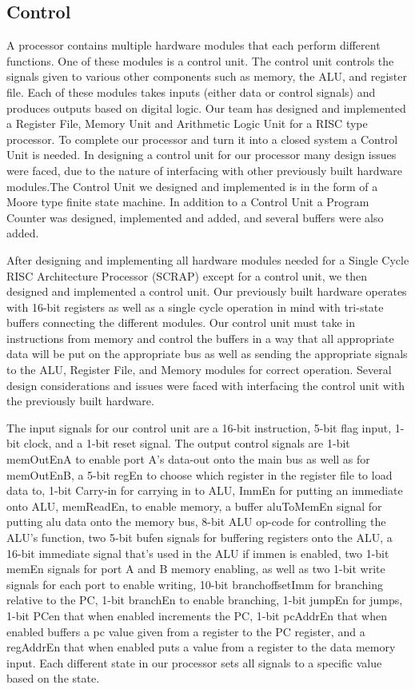 \documentclass[onecolumn, 12pt]{IEEEtran}
\begin{document}
\subsection{Control}
A processor contains multiple hardware modules that each perform different functions. One of these modules is a control unit. The control unit controls the signals given to various other components such as memory, the ALU, and register file. Each of these modules takes inputs (either data or control signals) and produces outputs based on digital logic. Our team has designed and implemented a Register File, Memory Unit and Arithmetic Logic Unit for a RISC type processor. To complete our processor and turn it into a closed system a Control Unit is needed. In designing a control unit for our processor many design issues were faced, due to the nature of interfacing with other previously built hardware modules.The Control Unit we designed and implemented is in the form of a Moore type finite state machine. In addition to a Control Unit a Program Counter was designed, implemented and added, and several buffers were also added.
\par
	After designing and implementing all hardware modules needed for a Single Cycle RISC Architecture Processor (SCRAP) except for a control unit, we then designed and implemented a control unit. Our previously built hardware operates with 16-bit registers as well as a single cycle operation in mind with tri-state buffers connecting the different modules. Our control unit must take in instructions from memory and control the buffers in a way that all appropriate data will be put on the appropriate bus as well as sending the appropriate signals to the ALU, Register File, and Memory modules for correct operation. Several design considerations and issues were faced with interfacing the control unit with the previously built hardware.
\par
	The input signals for our control unit are a 16-bit instruction, 5-bit flag input, 1-bit clock, and a 1-bit reset signal. The output control signals are 1-bit memOutEnA to enable port A's data-out onto the main bus as well as for memOutEnB, a 5-bit regEn to choose which register in the register file to load data to, 1-bit Carry-in for carrying in to ALU, ImmEn for putting an immediate onto ALU, memReadEn, to enable memory, a buffer aluToMemEn signal for putting alu data onto the memory bus, 8-bit ALU op-code for controlling the ALU's function, two 5-bit bufen signals for buffering registers onto the ALU, a 16-bit immediate signal that's used in the ALU if immen is enabled, two 1-bit memEn signals for port A and B memory enabling, as well as two 1-bit write signals for each port to enable writing, 10-bit branchoffsetImm for branching relative to the PC, 1-bit branchEn to enable branching, 1-bit jumpEn for jumps, 1-bit PCen  that when enabled increments the PC, 1-bit pcAddrEn that when enabled buffers a pc value given from a register to the PC register, and a regAddrEn that when enabled puts a value from a register to the data memory input. Each different state in our processor sets all signals to a specific value based on the state.
\end{document}
